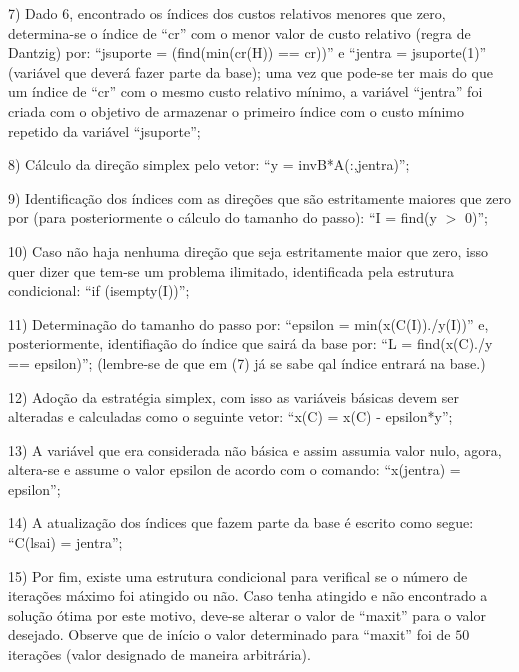 \documentclass[10pt]{article}
\begin{document}
7) Dado 6, encontrado os índices dos custos relativos menores que zero, determina-se o índice de ``cr'' com o menor valor de custo relativo (regra de Dantzig) por: ``jsuporte = (find(min(cr(H)) == cr))'' e ``jentra = jsuporte(1)'' (variável que deverá fazer parte da base); uma vez que pode-se ter mais do que um índice de ``cr'' com o mesmo custo relativo mínimo, a variável ``jentra'' foi criada com o objetivo de armazenar o primeiro índice com o custo mínimo repetido da variável ``jsuporte'';
\newline

8) Cálculo da direção simplex pelo vetor: ``y = invB*A(:,jentra)''; 
\newline

9) Identificação dos índices com as direções que são estritamente maiores que zero por (para posteriormente o cálculo do tamanho do passo): ``I = find(y $>$ 0)'';
\newline

10) Caso não haja nenhuma direção que seja estritamente maior que zero, isso quer dizer que tem-se um problema ilimitado, identificada pela estrutura condicional: ``if (isempty(I))'';
\newline

11) Determinação do tamanho do passo por: ``epsilon = min(x(C(I))./y(I))'' e, posteriormente, identifiação do índice que sairá da base por: ``L = find(x(C)./y == epsilon)''; (lembre-se de que em (7) já se sabe qal índice entrará na base.)
\newline

12) Adoção da estratégia simplex, com isso as variáveis básicas devem ser alteradas e calculadas como o seguinte vetor: ``x(C) = x(C) - epsilon*y'';
\newline

13) A variável que era considerada não básica e assim assumia valor nulo, agora, altera-se e assume o valor epsilon de acordo com o comando: ``x(jentra) = epsilon'';
\newline

14) A atualização dos índices que fazem parte da base é escrito como segue: ``C(lsai) = jentra'';
\newline

15) Por fim, existe uma estrutura condicional para verifical se o número de iterações máximo foi atingido ou não. Caso tenha atingido e não encontrado a solução ótima por este motivo, deve-se alterar o valor de ``maxit'' para o valor desejado. Observe que de início o valor determinado para ``maxit'' foi de $50$ iterações (valor designado de maneira arbitrária).
\newline
\end{document}
